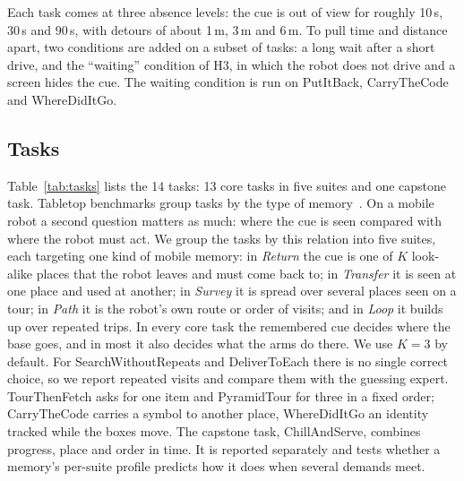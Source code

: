 \documentclass[conference]{IEEEtran}
\begin{document}
Each task comes at three absence levels: the cue is out of view for roughly 10\,s, 30\,s and 90\,s, with detours of about 1\,m, 3\,m and 6\,m. To pull time and distance apart, two conditions are added on a subset of tasks: a long wait after a short drive, and the ``waiting'' condition of H3, in which the robot does not drive and a screen hides the cue. The waiting condition is run on PutItBack, CarryTheCode and WhereDidItGo.

\subsection{Tasks}
\label{sec:tasks}

Table~\ref{tab:tasks} lists the 14 tasks: 13 core tasks in five suites and one capstone task. Tabletop benchmarks group tasks by the type of memory~\cite{dai2026robomme}. On a mobile robot a second question matters as much: where the cue is seen compared with where the robot must act. We group the tasks by this relation into five suites, each targeting one kind of mobile memory: in \emph{Return} the cue is one of $K$ look-alike places that the robot leaves and must come back to; in \emph{Transfer} it is seen at one place and used at another; in \emph{Survey} it is spread over several places seen on a tour; in \emph{Path} it is the robot's own route or order of visits; and in \emph{Loop} it builds up over repeated trips. In every core task the remembered cue decides where the base goes, and in most it also decides what the arms do there. We use $K = 3$ by default. For SearchWithoutRepeats and DeliverToEach there is no single correct choice, so we report repeated visits and compare them with the guessing expert. TourThenFetch asks for one item and PyramidTour for three in a fixed order; CarryTheCode carries a symbol to another place, WhereDidItGo an identity tracked while the boxes move. The capstone task, ChillAndServe, combines progress, place and order in time. It is reported separately and tests whether a memory's per-suite profile predicts how it does when several demands meet.
\end{document}

